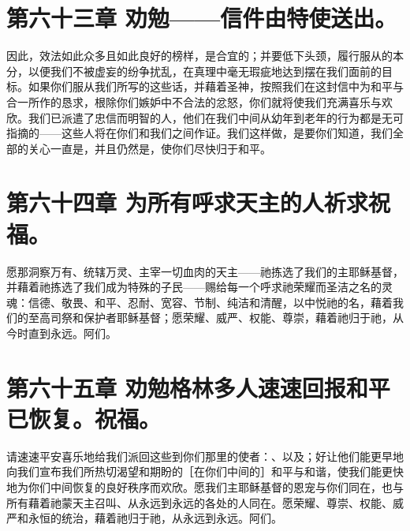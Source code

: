 
\section{第六十三章  劝勉——信件由特使送出。}

因此，效法如此众多且如此良好的榜样，是合宜的；并要低下头颈，履行服从的本分，以便我们不被虚妄的纷争扰乱，在真理中毫无瑕疵地达到摆在我们面前的目标。如果你们服从我们所写的这些话，并藉着圣神，按照我们在这封信中为和平与合一所作的恳求，根除你们嫉妒中不合法的忿怒，你们就将使我们充满喜乐与欢欣。我们已派遣了忠信而明智的人，他们在我们中间从幼年到老年的行为都是无可指摘的——这些人将在你们和我们之间作证。我们这样做，是要你们知道，我们全部的关心一直是，并且仍然是，使你们尽快归于和平。\par


\section{第六十四章  为所有呼求天主的人祈求祝福。}

愿那洞察万有、统辖万灵、主宰一切血肉的天主——祂拣选了我们的主耶稣基督，并藉着祂拣选了我们成为特殊的子民——赐给每一个呼求祂荣耀而圣洁之名的灵魂：信德、敬畏、和平、忍耐、宽容、节制、纯洁和清醒，以中悦祂的名，藉着我们的至高司祭和保护者耶稣基督；愿荣耀、威严、权能、尊崇，藉着祂归于祂，从今时直到永远。阿们。\par


\section{第六十五章  劝勉格林多人速速回报和平已恢复。祝福。}

请速速平安喜乐地给我们派回这些到你们那里的使者：、以及；好让他们能更早地向我们宣布我们所热切渴望和期盼的［在你们中间的］和平与和谐，使我们能更快地为你们中间恢复的良好秩序而欢欣。愿我们主耶稣基督的恩宠与你们同在，也与所有藉着祂蒙天主召叫、从永远到永远的各处的人同在。愿荣耀、尊崇、权能、威严和永恒的统治，藉着祂归于祂，从永远到永远。阿们。\par

